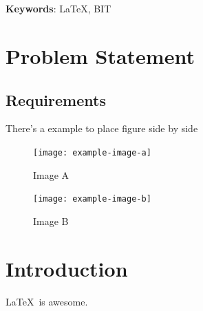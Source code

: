 \documentclass[11pt,english, openany]{book}
\begin{document}
{\hypersetup{linkcolor=black}
	\tableofcontents{}
}

\mainmatter

\chapter*{}
\lipsum[5]

\vspace{0.5cm}
\noindent\textbf{Keywords}: 
\LaTeX, BIT

\chapter{Problem Statement}\label{chapt:problem}

\lipsum[1-2]

\section{Requirements} 

There's a example to place figure side by side
\begin{figure}[h]
	\centering
	\begin{minipage}[c]{0.4\linewidth}
		\texttt{[image: example-image-a]}
		\caption{Image A}
	\end{minipage}
	\hspace{1.4cm}
	\begin{minipage}[c]{0.4\linewidth}
		\texttt{[image: example-image-b]}
		\caption{Image B}
	\end{minipage}%
\end{figure}

\chapter{Introduction}\label{chapt:intro}



\LaTeX~is awesome. \lipsum[1]

\vspace{0.6cm}
\begin{tcolorbox}[title=\textbf{tcolorbox example}]
	\lipsum[2]
\end{tcolorbox}
\end{document}
